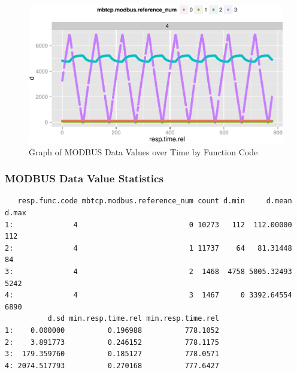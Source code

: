 \documentclass[12pt,]{article}
\begin{document}
\begin{figure}

{\centering \includegraphics{thesis_files/figure-latex/unnamed-chunk-30-1} 

}

\caption{Graph of MODBUS Data Values over Time by Function Code}\label{fig:unnamed-chunk-30}
\end{figure}

\subsubsection{MODBUS Data Value
Statistics}\label{modbus-data-value-statistics}

\begin{verbatim}
   resp.func.code mbtcp.modbus.reference_num count d.min     d.mean d.max
1:              4                          0 10273   112  112.00000   112
2:              4                          1 11737    64   81.31448    84
3:              4                          2  1468  4758 5005.32493  5242
4:              4                          3  1467     0 3392.64554  6890
          d.sd min.resp.time.rel min.resp.time.rel
1:    0.000000          0.196988          778.1052
2:    3.891773          0.246152          778.1175
3:  179.359760          0.185127          778.0571
4: 2074.517793          0.270168          777.6427
\end{verbatim}
\end{document}
